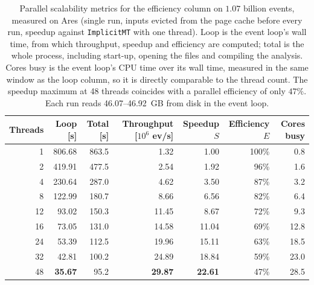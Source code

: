 \begin{table}[htbp]
\centering
\caption{Parallel scalability metrics for the efficiency column on $1.07$ billion events, measured on Ares (single run, inputs evicted from the page cache before every run, speedup against \texttt{ImplicitMT} with one thread). Loop is the event loop's wall time, from which throughput, speedup and efficiency are computed; total is the whole process, including start-up, opening the files and compiling the analysis. Cores busy is the event loop's CPU time over its wall time, measured in the same window as the loop column, so it is directly comparable to the thread count. The speedup maximum at 48 threads coincides with a parallel efficiency of only $47\%$. Each run reads 46.07--46.92~GB from disk in the event loop.}
\label{tab:scalability-efficiency}
\setlength{\tabcolsep}{5pt}
\begin{tabular}{rrrrrrr}
\toprule
Threads & Loop [s] & Total [s] & Throughput [$10^6$ ev/s] & Speedup $S$ & Efficiency $E$ & Cores busy \\
\midrule
 1 & 806.68 & 863.5 & 1.32 & 1.00 & 100\% & 0.8 \\
 2 & 419.91 & 477.5 & 2.54 & 1.92 & 96\% & 1.6 \\
 4 & 230.64 & 287.0 & 4.62 & 3.50 & 87\% & 3.2 \\
 8 & 122.99 & 180.7 & 8.66 & 6.56 & 82\% & 6.4 \\
12 & 93.02 & 150.3 & 11.45 & 8.67 & 72\% & 9.3 \\
16 & 73.05 & 131.0 & 14.58 & 11.04 & 69\% & 12.8 \\
24 & 53.39 & 112.5 & 19.96 & 15.11 & 63\% & 18.5 \\
32 & 42.81 & 100.2 & 24.89 & 18.84 & 59\% & 23.0 \\
48 & \textbf{35.67} & 95.2 & \textbf{29.87} & \textbf{22.61} & 47\% & 28.5 \\
\bottomrule
\end{tabular}
\end{table}
